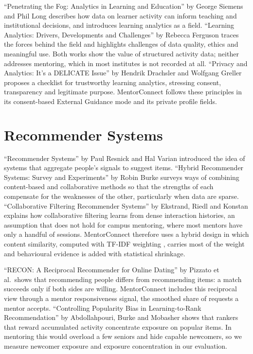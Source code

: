 \documentclass[12pt,a4paper]{report}
\begin{document}
``Penetrating the Fog: Analytics in Learning and Education'' \cite{siemens2011} by George Siemens and Phil Long describes how data on learner activity can inform teaching and institutional decisions, and introduces learning analytics as a field. ``Learning Analytics: Drivers, Developments and Challenges'' \cite{ferguson2012} by Rebecca Ferguson traces the forces behind the field and highlights challenges of data quality, ethics and meaningful use. Both works show the value of structured activity data; neither addresses mentoring, which in most institutes is not recorded at all. ``Privacy and Analytics: It's a DELICATE Issue'' \cite{drachsler2016} by Hendrik Drachsler and Wolfgang Greller proposes a checklist for trustworthy learning analytics, stressing consent, transparency and legitimate purpose. MentorConnect follows these principles in its consent-based External Guidance mode and its private profile fields.

\section{Recommender Systems}
``Recommender Systems'' \cite{resnick1997} by Paul Resnick and Hal Varian introduced the idea of systems that aggregate people's signals to suggest items. ``Hybrid Recommender Systems: Survey and Experiments'' \cite{burke2002} by Robin Burke surveys ways of combining content-based and collaborative methods so that the strengths of each compensate for the weaknesses of the other, particularly when data are sparse. ``Collaborative Filtering Recommender Systems'' \cite{ekstrand2011} by Ekstrand, Riedl and Konstan explains how collaborative filtering learns from dense interaction histories, an assumption that does not hold for campus mentoring, where most mentors have only a handful of sessions. MentorConnect therefore uses a hybrid design in which content similarity, computed with TF-IDF weighting \cite{salton1988}, carries most of the weight and behavioural evidence is added with statistical shrinkage.

``RECON: A Reciprocal Recommender for Online Dating'' \cite{pizzato2010} by Pizzato et al.\ shows that recommending people differs from recommending items: a match succeeds only if both sides are willing. MentorConnect includes this reciprocal view through a mentor responsiveness signal, the smoothed share of requests a mentor accepts. ``Controlling Popularity Bias in Learning-to-Rank Recommendation'' \cite{abdollahpouri2017} by Abdollahpouri, Burke and Mobasher shows that rankers that reward accumulated activity concentrate exposure on popular items. In mentoring this would overload a few seniors and hide capable newcomers, so we measure newcomer exposure and exposure concentration in our evaluation.
\end{document}
